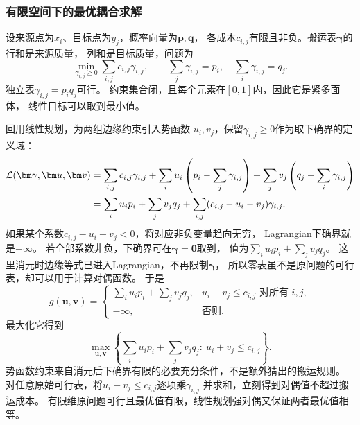 \subsubsection{有限空间下的最优耦合求解}
\label{sec:information-finite-transport}

设来源点为\(x_i\)、目标点为\(y_j\)，概率向量为\(\bm p,\bm q\)，
各成本\(c_{i,j}\)有限且非负。搬运表\(\bm\gamma\)的行和是来源质量，
列和是目标质量，问题为
\[
  \min_{\gamma_{i,j}\geq0}\sum_{i,j}c_{i,j}\gamma_{i,j},
  \qquad \sum_j\gamma_{i,j}=p_i,\quad\sum_i\gamma_{i,j}=q_j.
\]
独立表\(\gamma_{i,j}=p_iq_j\)可行。
约束集合闭，且每个元素在\([0,1]\)内，因此它是紧多面体，
线性目标可以取到最小值。

回用线性规划，为两组边缘约束引入势函数
\(u_i,v_j\)，保留\(\gamma_{i,j}\geq0\)作为取下确界的定义域：
\begin{align}
  \mathcal L(\bm\gamma,\bm u,\bm v)
  &=\sum_{i,j}c_{i,j}\gamma_{i,j}
    +\sum_i u_i\left(p_i-\sum_j\gamma_{i,j}\right)
    +\sum_j v_j\left(q_j-\sum_i\gamma_{i,j}\right)\notag\\
  &=\sum_i u_ip_i+\sum_jv_jq_j
    +\sum_{i,j}(c_{i,j}-u_i-v_j)\gamma_{i,j}.
  \label{eq:information-discrete-ot-lagrangian}
\end{align}
如果某个系数\(c_{i,j}-u_i-v_j<0\)，将对应非负变量趋向无穷，
Lagrangian下确界就是\(-\infty\)。
若全部系数非负，下确界可在\(\bm\gamma=\bm0\)取到，
值为\(\sum_i u_ip_i+\sum_jv_jq_j\)。
这里消元时边缘等式已进入Lagrangian，不再限制\(\bm\gamma\)，
所以零表虽不是原问题的可行表，却可以用于计算对偶函数。
于是
\[
  g(\bm u,\bm v)=
  \begin{cases}
    \sum_i u_ip_i+\sum_jv_jq_j,&u_i+v_j\leq c_{i,j}\text{ 对所有 }i,j,\\
    -\infty,&\text{否则}.
  \end{cases}
\]
最大化它得到
\begin{equation}
  \max_{\bm u,\bm v}
  \left\{\sum_i u_ip_i+\sum_jv_jq_j:\ u_i+v_j\leq c_{i,j}\right\}.
  \label{eq:information-discrete-ot-dual}
\end{equation}
势函数约束来自消元后下确界有限的必要充分条件，不是额外猜出的搬运规则。
对任意原始可行表，将\(u_i+v_j\leq c_{i,j}\)逐项乘\(\gamma_{i,j}\)
并求和，立刻得到对偶值不超过搬运成本。
有限维原问题可行且最优值有限，线性规划强对偶又保证两者最优值相等。

